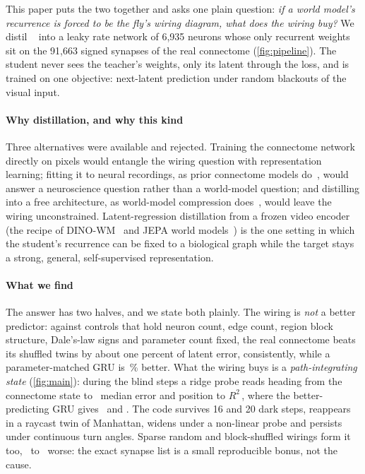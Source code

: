 This paper puts the two together and asks one plain question: \emph{if a world model's recurrence is forced to be the
fly's wiring diagram, what does the wiring buy?} We distil \vjepa~\cite{assran2025vjepa2} into a leaky rate network of
6,935 \flywire neurons whose only recurrent weights sit on the 91,663 signed synapses of the real connectome
(\cref{fig:pipeline}). The student never sees the teacher's weights, only its latent through the loss, and is trained on
one objective: next-latent prediction under random blackouts of the visual input.

\paragraph{Why distillation, and why this kind}
Three alternatives were available and rejected. Training the connectome network directly on pixels would entangle the
wiring question with representation learning; fitting it to neural recordings, as prior connectome models
do~\cite{lappalainen2024connectome}, would answer a neuroscience question rather than a world-model question; and
distilling into a free architecture, as world-model compression does~\cite{hinton2015distilling,kasai2021t2r}, would
leave the wiring unconstrained. Latent-regression distillation from a frozen video encoder (the recipe of
DINO-WM~\cite{zhou2024dinowm} and JEPA world models~\cite{assran2025vjepa2}) is the one setting in which the student's
recurrence can be fixed to a biological graph while the target stays a strong, general, self-supervised representation.

\paragraph{What we find}
The answer has two halves, and we state both plainly. The wiring is \emph{not} a better predictor: against controls that
hold neuron count, edge count, region block structure, Dale's-law signs and parameter count fixed, the real connectome
beats its shuffled twins by about one percent of latent error, consistently, while a parameter-matched GRU is
\nGruBetterArena\,\% better. What the wiring buys is a \emph{path-integrating state} (\cref{fig:main}): during the blind
steps a ridge probe reads heading from the connectome state to \nConnArenaHd\degree\ median error and position to
$R^2$\,\nConnArenaPos, where the better-predicting GRU gives \nGruArenaHd\degree\ and \nGruArenaPos. The code survives 16
and 20 dark steps, reappears in a raycast twin of Manhattan, widens under a non-linear probe and persists under
continuous turn angles. Sparse random and block-shuffled wirings form it too, \nConnBlockGapArena\ to
\nConnBlockGapArenaDarkSixteen\degree\ worse: the exact synapse list is a small reproducible bonus, not the cause.


